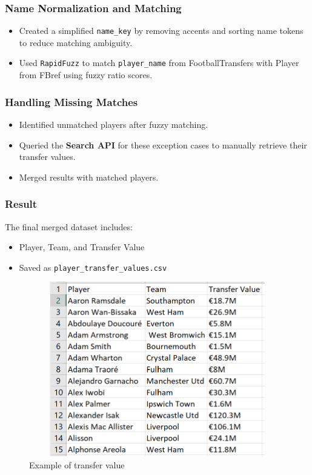 \documentclass[12pt,a4paper]{report}
\begin{document}
\subsubsection{Name Normalization and Matching}
\begin{itemize}
    \item Created a simplified \texttt{name\_key} by removing accents and sorting name tokens to reduce matching ambiguity.
    \item Used \texttt{RapidFuzz} to match \texttt{player\_name} from FootballTransfers with Player from FBref using fuzzy ratio scores.
\end{itemize}

\subsubsection{Handling Missing Matches}
\begin{itemize}
    \item Identified unmatched players after fuzzy matching.
    \item Queried the \textbf{Search API} for these exception cases to manually retrieve their transfer values.
    \item Merged results with matched players.
\end{itemize}

\subsubsection{Result}
The final merged dataset includes:
\begin{itemize}
    \item Player, Team, and Transfer Value
    \item Saved as \texttt{player\_transfer\_values.csv}
\end{itemize}

\begin{figure}[H]
    \centering
    \includegraphics[width=5in,height=3in]{media/image2.png}
    \caption{Example of transfer value}
\end{figure}
\end{document}
